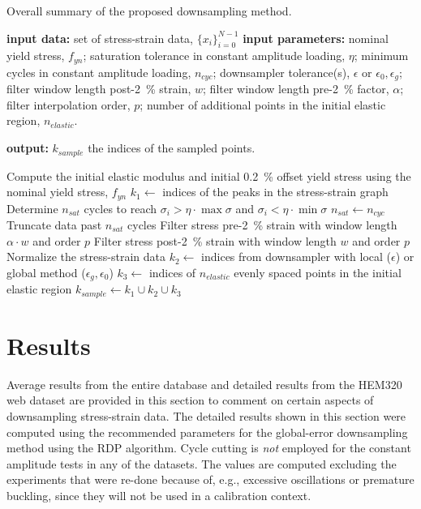 \documentclass[a4paper,11pt]{article}
\begin{document}
\begin{algorithm}
	\caption{Overall summary of the proposed downsampling method.}
	\label{alg:overall-summary}
	\begin{algorithmic}[1]
        \State \textbf{input data:} set of stress-strain data, $\{x_i\}_{i=0}^{N-1}$
        \State \textbf{input parameters:} nominal yield stress, $f_{yn}$; saturation tolerance in constant amplitude loading, $\eta$; minimum cycles in constant amplitude loading, $n_{cyc}$; downsampler tolerance(s), $\epsilon$ or $\epsilon_0, \epsilon_g$; filter window length post-2~\% strain, $w$; filter window length pre-2~\% factor, $\alpha$; filter interpolation order, $p$; number of additional points in the initial elastic region, $n_{elastic}$.

        \State \textbf{output:} $k_{sample}$ the indices of the sampled points.
        \bigskip

        \State Compute the initial elastic modulus and initial 0.2~\% offset yield stress using the nominal yield stress, $f_{yn}$
        \State $k_{1} \gets $ indices of the peaks in the stress-strain graph
            \State Determine $n_{sat}$ cycles to reach $\sigma_i > \eta \cdot \max \sigma$ and $\sigma_i < \eta \cdot \min \sigma$
                \State $n_{sat} \gets n_{cyc}$
            \EndIf
            \State Truncate data past $n_{sat}$ cycles
        \EndIf
            \State Filter stress pre-2~\% strain with window length $\alpha \cdot w$ and order $p$
            \State Filter stress post-2~\% strain with window length $w$ and order $p$
        \EndIf
        \State Normalize the stress-strain data
        \State $k_2 \gets$ indices from downsampler with local ($\epsilon$) or global method ($\epsilon_g, \epsilon_0$) \label{algline:downsampler}
        \State $k_3 \gets$ indices of $n_{elastic}$ evenly spaced points in the initial elastic region
        \State $k_{sample} \gets k_1 \cup k_2 \cup k_3$
    \end{algorithmic}
\end{algorithm}



\section{Results}

Average results from the entire database and detailed results from the HEM320 web dataset are provided in this section to comment on certain aspects of downsampling stress-strain data.
The detailed results shown in this section were computed using the recommended parameters for the global-error downsampling method using the RDP algorithm.
Cycle cutting is \emph{not} employed for the constant amplitude tests in any of the datasets.
The values are computed excluding the experiments that were re-done because of, e.g., excessive oscillations or premature buckling, since they will not be used in a calibration context.
\end{document}
